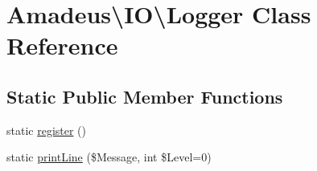 \hypertarget{classAmadeus_1_1IO_1_1Logger}{}\section{Amadeus\textbackslash{}IO\textbackslash{}Logger Class Reference}
\label{classAmadeus_1_1IO_1_1Logger}
\subsection*{Static Public Member Functions}
\begin{DoxyCompactItemize}
\item 
static \hyperlink{classAmadeus_1_1IO_1_1Logger_ab036ba7046f519398947a6114ade89df}{register} ()
\item 
static \hyperlink{classAmadeus_1_1IO_1_1Logger_ac45cf77193592c9e89925deb5d31521f}{print\+Line} (\$Message, int \$Level=0)
\end{DoxyCompactItemize}

